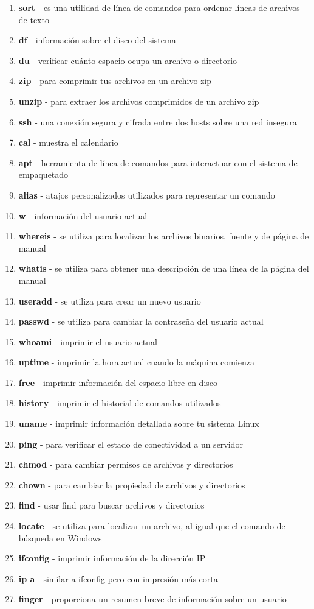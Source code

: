 \begin{enumerate}
\item \textbf{sort} - es una utilidad de línea de comandos para ordenar líneas de archivos de texto
\item \textbf{df} - información sobre el disco del sistema
\item \textbf{du} - verificar cuánto espacio ocupa un archivo o directorio
\item \textbf{zip} - para comprimir tus archivos en un archivo zip
\item \textbf{unzip} - para extraer los archivos comprimidos de un archivo zip
\item \textbf{ssh} - una conexión segura y cifrada entre dos hosts sobre una red insegura
\item \textbf{cal} - muestra el calendario
\item \textbf{apt} - herramienta de línea de comandos para interactuar con el sistema de empaquetado
\item \textbf{alias} - atajos personalizados utilizados para representar un comando
\item \textbf{w} - información del usuario actual
\item \textbf{whereis} - se utiliza para localizar los archivos binarios, fuente y de página de manual
\item \textbf{whatis} - se utiliza para obtener una descripción de una línea de la página del manual
\item \textbf{useradd} - se utiliza para crear un nuevo usuario
\item \textbf{passwd} - se utiliza para cambiar la contraseña del usuario actual
\item \textbf{whoami} - imprimir el usuario actual
\item \textbf{uptime} - imprimir la hora actual cuando la máquina comienza
\item \textbf{free} - imprimir información del espacio libre en disco
\item \textbf{history} - imprimir el historial de comandos utilizados
\item \textbf{uname} - imprimir información detallada sobre tu sistema Linux
\item \textbf{ping} - para verificar el estado de conectividad a un servidor
\item \textbf{chmod} - para cambiar permisos de archivos y directorios
\item \textbf{chown} - para cambiar la propiedad de archivos y directorios
\item \textbf{find} - usar find para buscar archivos y directorios
\item \textbf{locate} - se utiliza para localizar un archivo, al igual que el comando de búsqueda en Windows
\item \textbf{ifconfig} - imprimir información de la dirección IP
\item \textbf{ip a} - similar a ifconfig pero con impresión más corta
\item \textbf{finger} - proporciona un resumen breve de información sobre un usuario
\end{enumerate}
